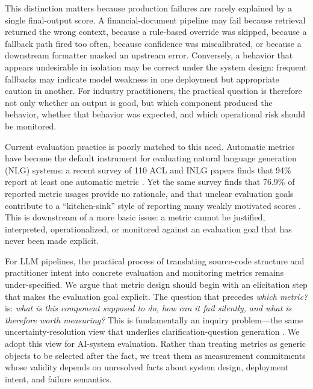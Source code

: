 \documentclass[11pt]{article}
\begin{document}
This distinction matters because production failures are rarely explained by a single final-output score. A financial-document pipeline may fail because retrieval returned the wrong context, because a rule-based override was skipped, because a fallback path fired too often, because confidence was miscalibrated, or because a downstream formatter masked an upstream error. Conversely, a behavior that appears undesirable in isolation may be correct under the system design: frequent fallbacks may indicate model weakness in one deployment but appropriate caution in another. For industry practitioners, the practical question is therefore not only whether an output is good, but which component produced the behavior, whether that behavior was expected, and which operational risk should be monitored.

Current evaluation practice is poorly matched to this need. Automatic metrics have become the default instrument for evaluating natural language generation (NLG) systems: a recent survey of 110 ACL and INLG papers finds that 94\% report at least one automatic metric \citep{schmidtova-etal-2024-automatic-metrics}. Yet the same survey finds that 76.9\% of reported metric usages provide no rationale, and that unclear evaluation goals contribute to a ``kitchen-sink'' style of reporting many weakly motivated scores \citep{schmidtova-etal-2024-automatic-metrics,zhou-etal-2022-deconstructing}. This is downstream of a more basic issue: a metric cannot be justified, interpreted, operationalized, or monitored against an evaluation goal that has never been made explicit.

For LLM pipelines, the practical process of translating source-code structure and practitioner intent into concrete evaluation and monitoring metrics remains under-specified. We argue that metric design should begin with an elicitation step that makes the evaluation goal explicit. The question that precedes \emph{which metric?} is: \emph{what is this component supposed to do, how can it fail silently, and what is therefore worth measuring?} This is fundamentally an inquiry problem---the same uncertainty-resolution view that underlies clarification-question generation \citep{rao-daume-iii-2018-learning}. We adopt this view for AI-system evaluation. Rather than treating metrics as generic objects to be selected after the fact, we treat them as measurement commitments whose validity depends on unresolved facts about system design, deployment intent, and failure semantics.
\end{document}

